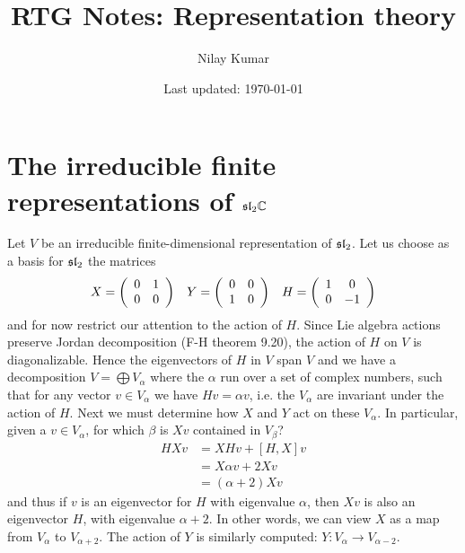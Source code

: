 \documentclass{../mathnotes}
\title{RTG Notes: Representation theory}
\author{Nilay Kumar}
\date{Last updated: \today}
\begin{document}
\maketitle

\setcounter{section}{0}

\section{The irreducible finite representations of $\mathfrak{sl}_2\mathbb{C}$}

Let $V$ be an irreducible finite-dimensional representation of $\mathfrak{sl}_2$. Let us choose as a basis for $\mathfrak{sl}_2$ the matrices
\begin{equation}
    \begin{array}[]{ccc}
        X=\left(
        \begin{array}[]{cc}
            0 & 1\\
            0 & 0
        \end{array}
        \right)
        &
        Y=\left(
        \begin{array}[]{cc}
            0 & 0\\
            1 & 0
        \end{array}
        \right)
        &
        H=\left(
        \begin{array}[]{cc}
            1 & 0\\
            0 & -1
        \end{array}
        \right)
    \end{array}
\end{equation}
and for now restrict our attention to the action of $H$. Since Lie algebra actions preserve Jordan decomposition (F-H theorem 9.20),
the action of $H$ on $V$ is diagonalizable. Hence the eigenvectors of $H$ in $V$ span $V$ and we have a decomposition $V=\bigoplus V_\alpha$
where the $\alpha$ run over a set of complex numbers, such that for any vector $v\in V_\alpha$ we have $Hv=\alpha v$, i.e.
the $V_\alpha$ are invariant under the action of $H$. Next we must determine how $X$ and $Y$ act on these $V_\alpha$. In particular,
given a $v\in V_\alpha$, for which $\beta$ is $Xv$ contained in $V_\beta$?
\begin{align*}
    HXv&=XHv+[H,X]v\\
    &=X\alpha v+2Xv\\
    &=(\alpha+2)Xv
\end{align*}
and thus if $v$ is an eigenvector for $H$ with eigenvalue $\alpha$, then $Xv$ is also an eigenvector $H$, with eigenvalue $\alpha+2$.
In other words, we can view $X$ as a map from $V_\alpha$ to $V_{\alpha+2}$. The action of $Y$ is similarly computed: $Y:V_\alpha\to V_{\alpha-2}$.
\end{document}
